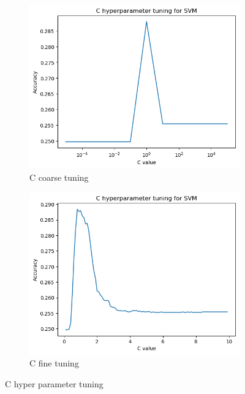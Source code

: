 \documentclass[12pt]{article}
\begin{document}
\begin{figure}[h]
\centering
\begin{subfigure}{.5\textwidth}
  \centering
  \includegraphics[width=.6\linewidth]{Cross_valid_plots/SVM_C_hyper_fig_coarse.png}
  \caption{C coarse tuning}
  \label{fig:sub1}
\end{subfigure}%
\begin{subfigure}{.5\textwidth}
  \centering
  \includegraphics[width=.6\linewidth]{Cross_valid_plots/SVM_C_hyper_fig_fine.png}
  \caption{C fine tuning}
  \label{fig:sub2}
\end{subfigure}
\caption{C hyper parameter tuning}
\label{fig:test}
\end{figure}
 
\newpage
\end{document}
